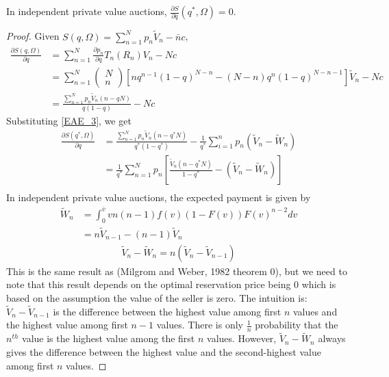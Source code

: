 \documentclass[11pt]{elegantbook_2}
\begin{document}
\begin{lemma}\label{Lemma:opt_q}
    In independent private value auctions, $\frac{\partial S}{\partial q}(q^*,\Omega)=0$.
\end{lemma}
\begin{proof}
    Given $S(q,\Omega)=\sum_{n=1}^N p_n \tilde{V}_n-\bar{n}c$,
    \begin{equation}
        \begin{aligned}
            \frac{\partial S(q,\Omega)}{\partial q}&=\sum_{n=1}^N \frac{\partial p_n}{\partial q} T_n(R_n)V_n-Nc\\
            &=\sum_{n=1}^N\begin{pmatrix}N\\n\end{pmatrix}\left[n q^{n-1}(1-q)^{N-n}-(N-n)q^n(1-q)^{N-n-1}\right]\tilde{V}_n-Nc\\
            &=\frac{\sum_{n=1}^N p_n \tilde{V}_n (n-qN)}{q(1-q)}-Nc
        \end{aligned}
        \label{EAE_4}
    \end{equation}
    Substituting \eqref{EAE_3}, we get
    \begin{equation}
        \begin{aligned}
            \frac{\partial S(q^*,\Omega)}{\partial q}&=\frac{\sum_{n=1}^N p_n \tilde{V}_n (n-q^*N)}{q^*(1-q^*)}-\frac{1}{q^*}\sum_{i=1}^n p_n \left(\tilde{V}_n-\tilde{W}_n\right)\\
            &=\frac{1}{q^*}\sum_{n=1}^N p_n \left[\frac{\tilde{V}_n (n-q^*N)}{1-q^*}-\left(\tilde{V}_n-\tilde{W}_n\right)\right]\\
        \end{aligned}
        \nonumber
    \end{equation}
    In independent private value auctions, the expected payment is given by
    \begin{equation}
        \begin{aligned}
            \tilde{W}_n&=\int_{0}^{\bar{v}}v n(n-1)f(v)(1-F(v))F(v)^{n-2}dv\\
            &=n\tilde{V}_{n-1}-(n-1)\tilde{V}_{n}
        \end{aligned}
        \nonumber
    \end{equation}
    \begin{equation}
        \begin{aligned}
            \tilde{V}_n-\tilde{W}_n=n\left(\tilde{V}_n-\tilde{V}_{n-1}\right)
        \end{aligned}
        \nonumber
    \end{equation}
    This is the same result as (Milgrom and Weber, 1982 theorem
    0), but we need to note that this result depends on the optimal reservation price being $0$ which is based on the assumption the value of the seller is zero. The intuition is: $\tilde{V}_n-\tilde{V}_{n-1}$ is the difference between the highest value among first $n$ values and the highest value among first $n-1$ values. There is only $\frac{1}{n}$ probability that the $n^{th}$ value is the highest value among the first $n$ values. However, $\tilde{V}_n-\tilde{W}_n$ always gives the difference between the highest value and the second-highest value among first $n$ values.


\end{proof}
\end{document}
